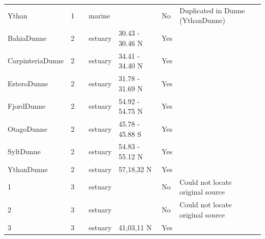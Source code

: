 \documentclass[12pt]{article}
\begin{document}
\begin{landscape}
\begin{table}[h!]
{\begin{tabular}{p{2.8cm}p{1.3cm}p{5.5cm}p{2.2cm}p{2.5cm}lp{3.5cm}}
        Ythan & 1 & \cite{Huxham1996}     & marine &       & No    & Duplicated in Dunne (YthanDunne) \\
        BahiaDunne & 2 & \cite{Hechinger2011}  & estuary & 30.43 - 30.46 N & Yes   &        \\
        CarpinteriaDunne & 2 & \cite{Hechinger2011}    & estuary & 34.41 - 34.40 N & Yes   &        \\
        EsteroDunne & 2 & \cite{Hechinger2011}  & estuary & 31.78 - 31.69 N & Yes   &        \\
        FjordDunne & 2 & \cite{Zander2011}  & estuary & 54.92 - 54.75 N & Yes   &        \\
        OtagoDunne & 2 & \cite{Mouritsen2011}  & estuary & 45.78 - 45.88 S & Yes   &        \\
        SyltDunne & 2 & \cite{Thieltges2011}  & estuary & 54.83 - 55.12 N & Yes   &        \\
        YthanDunne & 2 & \cite{Huxham1996}  & estuary & 57,18,32 N & Yes   &        \\
        1     & 3 & \cite{Qazim1970}  & estuary &       & No    & Could not locate original source \\
        2     & 3 & \cite{Day1967} & estuary &       & No    & Could not locate original source \\
        3     & 3 & \cite{Woodwell1967}    & estuary & 41,03,11 N & Yes   &       \\
        \hline
      \end{tabular}}%
      \end{table}

        \newpage


\end{landscape}
\end{document}
